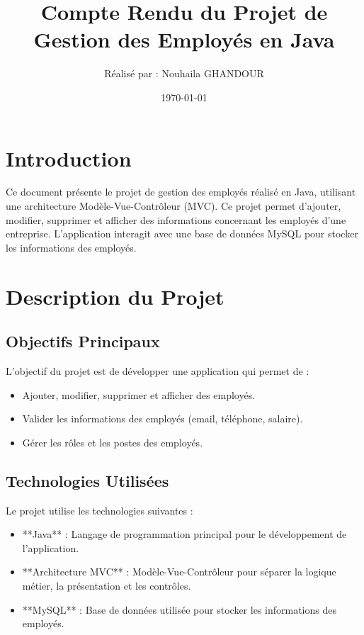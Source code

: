 \documentclass[a4paper,12pt]{report}
\begin{document}
\title{\textbf{Compte Rendu du Projet de Gestion des Employés en Java}}
\author{Réalisé par : Nouhaila GHANDOUR}
\date{\today}  %
\maketitle

\chapter*{Introduction}
Ce document présente le projet de gestion des employés réalisé en Java, utilisant une architecture Modèle-Vue-Contrôleur (MVC). Ce projet permet d'ajouter, modifier, supprimer et afficher des informations concernant les employés d'une entreprise. L'application interagit avec une base de données MySQL pour stocker les informations des employés.

\chapter{Description du Projet}
\section{Objectifs Principaux}
L'objectif du projet est de développer une application qui permet de :
\begin{itemize}
    \item Ajouter, modifier, supprimer et afficher des employés.
    \item Valider les informations des employés (email, téléphone, salaire).
    \item Gérer les rôles et les postes des employés.
\end{itemize}

\section{Technologies Utilisées}
Le projet utilise les technologies suivantes :
\begin{itemize}
    \item **Java** : Langage de programmation principal pour le développement de l'application.
    \item **Architecture MVC** : Modèle-Vue-Contrôleur pour séparer la logique métier, la présentation et les contrôles.
    \item **MySQL** : Base de données utilisée pour stocker les informations des employés.
\end{itemize}
\end{document}
